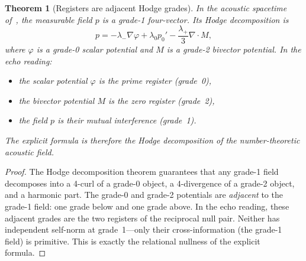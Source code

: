 \documentclass[11pt,a4paper]{article}
\theoremstyle{plain}
\newtheorem{theorem}{Theorem}[section]
\theoremstyle{definition}
\theoremstyle{remark}
\numberwithin{equation}{section}
\begin{document}
\begin{theorem}[Registers are adjacent Hodge grades]
\label{thm:hodge-registers}
In the acoustic spacetime of~\cite{burns2024}, the measurable field \(p\) is
a grade-1 four-vector.  Its Hodge decomposition is
\[
  p=-\lambda_-\nabla\varphi+\lambda_0 p_0'
  -\frac{\lambda_+}{3}\nabla\cdot M,
\]
where \(\varphi\) is a grade-0 scalar potential and \(M\) is a grade-2
bivector potential.  In the echo reading:
\begin{itemize}
  \item the scalar potential \(\varphi\) is the prime register (grade~0),
  \item the bivector potential \(M\) is the zero register (grade~2),
  \item the field \(p\) is their mutual interference (grade~1).
\end{itemize}
The explicit formula is therefore the Hodge decomposition of the
number-theoretic acoustic field.
\end{theorem}

\begin{proof}
The Hodge decomposition theorem guarantees that any grade-1 field
decomposes into a 4-curl of a grade-0 object, a 4-divergence of a
grade-2 object, and a harmonic part.  The grade-0 and grade-2 potentials
are \emph{adjacent} to the grade-1 field: one grade below and one grade
above.  In the echo reading, these adjacent grades are the two registers
of the reciprocal null pair.  Neither has independent self-norm at
grade~1---only their cross-information (the grade-1 field) is primitive.
This is exactly the relational nullness of the explicit formula.
\end{proof}
\end{document}
